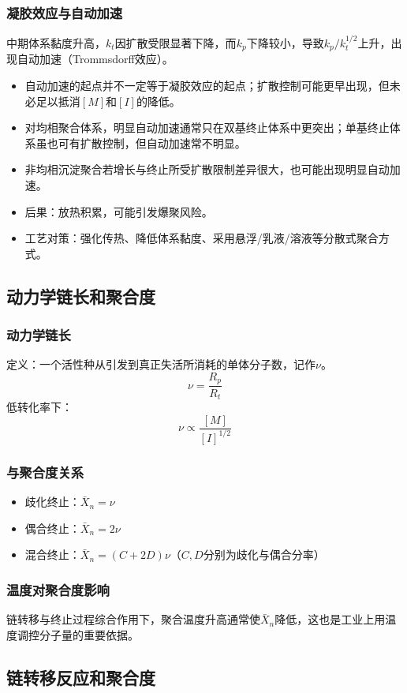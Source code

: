 ﻿\documentclass[12pt,a4paper]{article}
\begin{document}
\subsubsection{凝胶效应与自动加速}
中期体系黏度升高，$k_t$因扩散受限显著下降，而$k_p$下降较小，导致$k_p/k_t^{1/2}$上升，出现自动加速（Trommsdorff效应）。
\begin{itemize}
  \item 自动加速的起点并不一定等于凝胶效应的起点；扩散控制可能更早出现，但未必足以抵消$[M]$和$[I]$的降低。
  \item 对均相聚合体系，明显自动加速通常只在双基终止体系中更突出；单基终止体系虽也可有扩散控制，但自动加速常不明显。
  \item 非均相沉淀聚合若增长与终止所受扩散限制差异很大，也可能出现明显自动加速。
  \item 后果：放热积累，可能引发爆聚风险。
  \item 工艺对策：强化传热、降低体系黏度、采用悬浮/乳液/溶液等分散式聚合方式。
\end{itemize}

\subsection{动力学链长和聚合度}
\subsubsection{动力学链长}
定义：一个活性种从引发到真正失活所消耗的单体分子数，记作$\nu$。
\[
\nu=\frac{R_p}{R_t}
\]
低转化率下：
\[
\nu\propto \frac{[M]}{[I]^{1/2}}
\]

\subsubsection{与聚合度关系}
\begin{itemize}
  \item 歧化终止：$\bar{X}_n=\nu$
  \item 偶合终止：$\bar{X}_n=2\nu$
  \item 混合终止：$\bar{X}_n=(C+2D)\nu$（$C,D$分别为歧化与偶合分率）
\end{itemize}

\subsubsection{温度对聚合度影响}
链转移与终止过程综合作用下，聚合温度升高通常使$\bar{X}_n$降低，这也是工业上用温度调控分子量的重要依据。

\subsection{链转移反应和聚合度}
\end{document}
